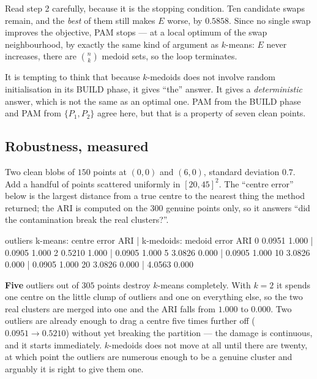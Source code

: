\documentclass[11pt]{article}
\begin{document}
Read step 2 carefully, because it is the stopping condition. Ten candidate
swaps remain, and the \emph{best} of them still makes $E$ worse, by $0.5858$.
Since no single swap improves the objective, PAM stops --- at a local optimum
of the swap neighbourhood, by exactly the same kind of argument as $k$-means:
$E$ never increases, there are $\binom{n}{k}$ medoid sets, so the loop
terminates.

\begin{caution}
It is tempting to think that because $k$-medoids does not involve random
initialisation in its BUILD phase, it gives ``the'' answer. It gives a
\emph{deterministic} answer, which is not the same as an optimal one. PAM
from the BUILD phase and PAM from $\{P_1,P_2\}$ agree here, but that is a
property of seven clean points.
\end{caution}

\subsection{Robustness, measured}

Two clean blobs of $150$ points at $(0,0)$ and $(6,0)$, standard deviation
$0.7$. Add a handful of points scattered uniformly in $[20,45]^2$. The
``centre error'' below is the largest distance from a true centre to the
nearest thing the method returned; the ARI is computed on the $300$ genuine
points only, so it answers ``did the contamination break the real clusters?''.

\begin{codeout}
  outliers  k-means: centre error  ARI  |  k-medoids: medoid error  ARI
       0              0.0951   1.000  |                0.0905   1.000
       2              0.5210   1.000  |                0.0905   1.000
       5              3.0826   0.000  |                0.0905   1.000
      10              3.0826   0.000  |                0.0905   1.000
      20              3.0826   0.000  |                4.0563   0.000
\end{codeout}

\textbf{Five} outliers out of $305$ points destroy $k$-means completely. With
$k = 2$ it spends one centre on the little clump of outliers and one on
everything else, so the two real clusters are merged into one and the ARI
falls from $1.000$ to $0.000$. Two outliers are already enough to drag a
centre five times further off ($0.0951 \to 0.5210$) without yet breaking the
partition --- the damage is continuous, and it starts immediately.
$k$-medoids does not move at all until there are twenty, at which point the
outliers are numerous enough to be a genuine cluster and arguably it is right
to give them one.
\end{document}
